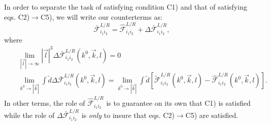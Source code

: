 \documentclass[11pt]{article}
\begin{document}
In order to separate the task of satisfying condition C1) and that of satisfying eqs. C2)$\rightarrow$C5), we will write our counterterms as:
\begin{equation}
\mathcal{\bar{F}}^{L/R}_{i_1i_2} = \mathcal{\hat{F}}^{L/R}_{i_1i_2}+\Delta \mathcal{\bar{F}}^{L/R}_{i_1i_2},
\end{equation}
where
\begin{eqnarray}
&&\lim_{|\vec{l}|\rightarrow \infty} |\vec{l}|^3 \Delta \mathcal{\bar{F}}^{L/R}_{i_1i_2}(k^0, \vec{k},l) = 0 \\
&&\lim_{k^0\rightarrow |\vec{k}|} \int \tilde{d} \Delta \mathcal{\bar{F}}^{L/R}_{i_1i_2}(k^0, \vec{k},l) = 
\lim_{k^0\rightarrow |\vec{k}|} \int \tilde{d} \left[ \mathcal{\tilde{F}}^{L/R}_{i_1i_2}(k^0, \vec{k},l) - \mathcal{\hat{F}}^{L/R}_{i_1i_2}(k^0, \vec{k},l) \right]. \label{constraintOnDeltaF}
\end{eqnarray}
In other terms, the role of $\mathcal{\hat{F}}^{L/R}_{i_1i_2}$ is to guarantee on its own that C1) is satisfied while the role of $\Delta \mathcal{\bar{F}}^{L/R}_{i_1i_2}$ is \emph{only} to insure that eqs. C2)$\rightarrow$C5) are satisfied.\\
\end{document}
